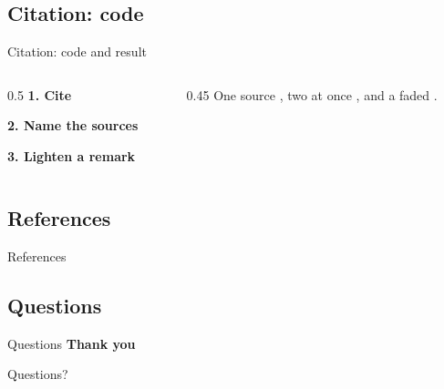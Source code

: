 \documentclass[aspectratio=1610,xcolor=dvipsnames]{beamer}
\begin{document}
\subsection{Citation: code}
\begin{frame}[fragile]{Citation: code and result}
\begin{columns}[T,onlytextwidth]
\begin{column}{0.5\textwidth}
\textbf{1. Cite}\par\smallskip
\begin{codeonly}
\cite{p1}
\cite{p1,p2}
\end{codeonly}
\smallskip
\textbf{2. Name the sources}\par\smallskip
\begin{codeonly}
\end{codeonly}
\smallskip
\textbf{3. Lighten a remark}\par\smallskip
\begin{codeonly}
\end{codeonly}
\end{column}
\begin{column}{0.45\textwidth}
One source \cite{p1}, two at once \cite{p1,p2}, and a faded .
\end{column}
\end{columns}
\end{frame}

\subsection{References}
\begin{frame}{References}
    \footnotesize
    
\end{frame}

\subsection{Questions}
\begin{frame}{Questions}
    \darkslide
    {\Huge\bfseries Thank you}\par\bigskip
    {\Large Questions?}
\end{frame}
\end{document}
